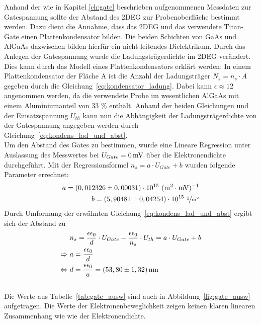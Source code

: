 Anhand der wie in Kapitel \ref{ch:gate} beschrieben aufgenommenen Messdaten zur Gatespannung sollte der Abstand des 2DEG zur Probenoberfläche bestimmt werden. Dazu dient die Annahme, dass das 2DEG und das verwendete Titan-Gate einen Plattenkondensator bilden. Die beiden Schichten von GaAs und AlGaAs dazwischen bilden hierfür ein nicht-leitendes Dielektrikum. 
Durch das Anlegen der Gatespannung wurde die Ladungsträgerdichte im 2DEG verändert.  Dies kann durch das Modell eines Plattenkondensators erklärt werden: In einem Plattenkondensator der Fläche A ist die Anzahl der Ladungsträger $N_s=n_s \cdot A$ gegeben durch die Gleichung~\eqref{eq:kondensator_ladung}. Dabei kann $\epsilon \approx 12$ angenommen werden, da die verwendete Probe im wesentlichen AlGaAs mit einem Aluminiumanteil von 33 \% enthält. Anhand der beiden Gleichungen und der Einsatzspannung $U_{th}$ kann nun die Abhängigkeit der Ladungsträgerdichte von der Gatespannung angegeben werden durch Gleichung~\eqref{eq:kondens_lad_und_abst}.\\

Um den Abstand des Gates zu bestimmen, wurde eine Lineare Regression unter Auslassung des Messwertes bei $U_{Gate}=\unit[0]{mV}$ über die Elektronendichte durchgeführt. Mit der Regressionsformel $n_s=a\cdot U_{Gate} + b$ wurden folgende Parameter errechnet:
\begin{align}
a = ( 0,012326 \pm 0,00031)\cdot 10^{15} ~ \unit{(m^2 \cdot mV)^{-1}}\\
b=( 5,90481 \pm 0,04254 )\cdot 10^{15} ~ \unitfrac{1}{m^2}
\end{align}
Durch Umformung der erwähnten Gleichung~\eqref{eq:kondens_lad_und_abst} ergibt sich der Abstand zu
\begin{align}
& n_s=\frac{\epsilon \epsilon_0}{d}\cdot U_{Gate} - \frac{\epsilon \epsilon_0}{n_s} \cdot U_{th}= a \cdot U_{Gate} + b \\
\Rightarrow~ & a=\frac{\epsilon \epsilon_0}{d}\\
\Leftrightarrow~ & d=\frac{\epsilon \epsilon_0}{a} = \unit[(53,80 \pm 1,32)]{nm}
\end{align}\\

Die Werte aus Tabelle~\ref{tab:gate_ausw} sind auch in Abbildung~\ref{fig:gate_ausw} aufgetragen. Die Werte der Elektronenbeweglichkeit zeigen keinen klaren linearen Zusammenhang wie wie der Elektronendichte. %

